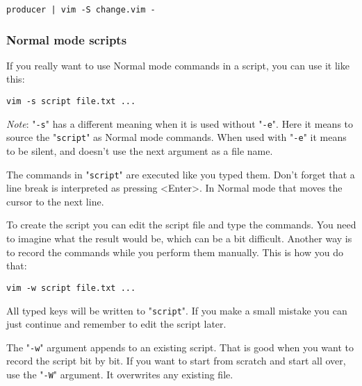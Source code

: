 \begin{Verbatim}[samepage=true]
 producer | vim -S change.vim -
\end{Verbatim}

\subsubsection{Normal mode scripts}
If you really want to use Normal mode commands in a script, you can use it like this:

\begin{Verbatim}[samepage=true]
 vim -s script file.txt ...
\end{Verbatim}
 
\emph{Note}: "\texttt{-s}" has a different meaning when it is used without "\texttt{-e}".
Here it means to source the "\texttt{script}" as Normal mode commands.
When used with "\texttt{-e}" it means to be silent, and doesn't use the next argument as a file name.

The commands in "\texttt{script}" are executed like you typed them.
Don't forget that a line break is interpreted as pressing <Enter>.
In Normal mode that moves the cursor to the next line.

To create the script you can edit the script file and type the commands.
You need to imagine what the result would be, which can be a bit difficult.
Another way is to record the commands while you perform them manually.
This is how you do that:

\begin{Verbatim}[samepage=true]
 vim -w script file.txt ...
\end{Verbatim}

All typed keys will be written to "\texttt{script}".
If you make a small mistake you can just continue and remember to edit the script later.

The "\texttt{-w}" argument appends to an existing script.
That is good when you want to record the script bit by bit.
If you want to start from scratch and start all over, use the "\texttt{-W}" argument.
It overwrites any existing file.
\clearpage
